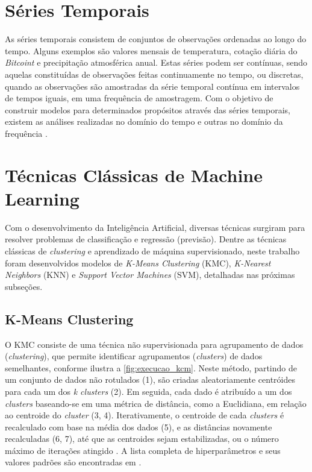 \section{Séries Temporais}

As séries temporais consistem de conjuntos de observações ordenadas ao longo do tempo. Alguns exemplos são valores mensais de temperatura, cotação diária do \textit{Bitcoint} e precipitação atmosférica anual. Estas séries podem ser contínuas, sendo aquelas constituídas de observações feitas continuamente no tempo, ou discretas, quando as observações são amostradas da série temporal contínua em intervalos de tempos iguais, em uma frequência de amostragem. Com o objetivo de construir modelos para determinados propósitos através das séries temporais, existem as análises realizadas no domínio do tempo e outras no domínio da frequência \cite{Morettin2018}.

\section{Técnicas Clássicas de Machine Learning}

Com o desenvolvimento da Inteligência Artificial, diversas técnicas surgiram para resolver problemas de classificação e regressão (previsão). Dentre as técnicas clássicas de \textit{clustering} e aprendizado de máquina supervisionado, neste trabalho foram desenvolvidos modelos de \textit{K-Means Clustering} (KMC), \textit{K-Nearest Neighbors} (KNN) e \textit{Support Vector Machines} (SVM), detalhadas nas próximas subseções.

\subsection{K-Means Clustering}

O KMC consiste de uma técnica não supervisionada para agrupamento de dados (\textit{clustering}), que permite identificar agrupamentos (\textit{clusters}) de dados semelhantes, conforme ilustra a \autoref{fig:execucao_kcm}. Neste método, partindo de um conjunto de dados não rotulados (1), são criadas aleatoriamente centróides para cada um dos \textit{k clusters} (2). Em seguida, cada dado é atribuído a um dos \textit{clusters} baseando-se em uma métrica de distância, como a Euclidiana, em relação ao centroide do \textit{cluster} (3, 4). Iterativamente, o centroide de cada \textit{clusters} é recalculado com base na média dos dados (5), e as distâncias novamente recalculadas (6, 7), até que as centroides sejam estabilizadas, ou o número máximo de iterações atingido \cite{foley2019,nisbet2009}.  A lista completa de hiperparâmetros e seus valores padrões são encontradas em .

